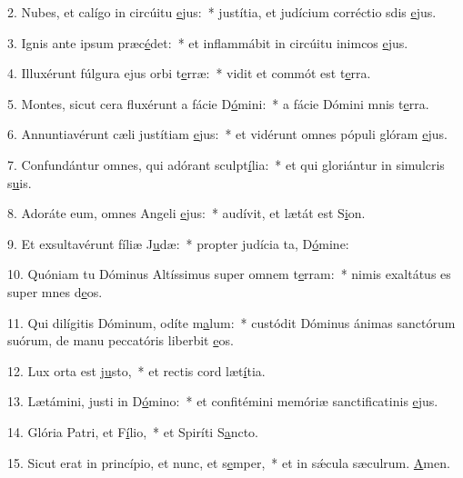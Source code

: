 2. Nubes, et calígo in circúitu \uline{e}jus:~* justítia, et judícium corréctio sdis \uline{e}jus.\par 
3. Ignis ante ipsum præc\uline{é}det:~* et inflammábit in circúitu inimcos \uline{e}jus.\par 
4. Illuxérunt fúlgura ejus orbi t\uline{e}rræ:~* vidit et commót est t\uline{e}rra.\par 
5. Montes, sicut cera fluxérunt a fácie D\uline{ó}mini:~* a fácie Dómini mnis t\uline{e}rra.\par 
6. Annuntiavérunt cæli justítiam \uline{e}jus:~* et vidérunt omnes pópuli glóram \uline{e}jus.\par 
7. Confundántur omnes, qui adórant sculpt\uline{í}lia:~* et qui gloriántur in simulcris s\uline{u}is.\par 
8. Adoráte eum, omnes Angeli \uline{e}jus:~* audívit, et lætát est S\uline{i}on.\par 
9. Et exsultavérunt fíliæ J\uline{u}dæ:~* propter judícia ta, D\uline{ó}mine:\par 
10. Quóniam tu Dóminus Altíssimus super omnem t\uline{e}rram:~* nimis exaltátus es super mnes d\uline{e}os.\par 
11. Qui dilígitis Dóminum, odíte m\uline{a}lum:~* custódit Dóminus ánimas sanctórum suórum, de manu peccatóris liberbit \uline{e}os.\par 
12. Lux orta est j\uline{u}sto,~* et rectis cord læt\uline{í}tia.\par 
13. Lætámini, justi in D\uline{ó}mino:~* et confitémini memóriæ sanctificatinis \uline{e}jus.\par 
14. Glória Patri, et F\uline{í}lio,~* et Spiríti S\uline{a}ncto.\par 
15. Sicut erat in princípio, et nunc, et s\uline{e}mper,~* et in sǽcula sæculrum. \uline{A}men.\par 
